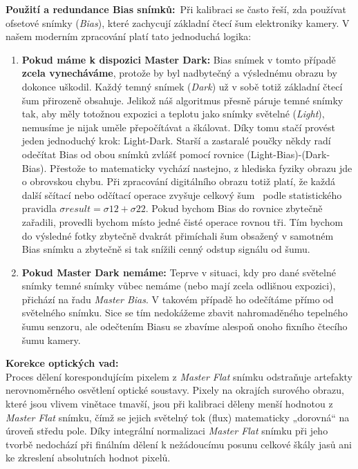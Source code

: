 \textbf{Použití a redundance Bias snímků:}\ Při kalibraci se často řeší, zda používat ofsetové snímky (\textit{Bias}), které zachycují základní čtecí šum elektroniky kamery. V našem moderním zpracování platí tato jednoduchá logika:
\begin{enumerate} 
    \item \textbf{Pokud máme k dispozici Master Dark:} Bias snímek v tomto případě \textbf{zcela vynecháváme}, protože by byl nadbytečný a výslednému obrazu by dokonce uškodil. Každý temný snímek (\textit{Dark}) už v sobě totiž základní čtecí šum přirozeně obsahuje. Jelikož náš algoritmus přesně páruje temné snímky tak, aby měly totožnou expozici a teplotu jako snímky světelné (\textit{Light}), nemusíme je nijak uměle přepočítávat a škálovat.
    Díky tomu stačí provést jeden jednoduchý krok: Light-Dark. Starší a zastaralé poučky někdy radí odečítat Bias od obou snímků zvlášť pomocí rovnice (Light-Bias)-(Dark-Bias). Přestože to matematicky vychází nastejno, z hlediska fyziky obrazu jde o obrovskou chybu. Při zpracování digitálního obrazu totiž platí, že každá další sčítací nebo odčítací operace zvyšuje celkový šum~\cite{howell2006} podle statistického pravidla $\sigma result =\sigma 12 + \sigma 22 $. Pokud bychom Bias do rovnice zbytečně zařadili, provedli bychom místo jedné čisté operace rovnou tři. Tím bychom do výsledné fotky zbytečně dvakrát přimíchali šum obsažený v samotném Bias snímku a zbytečně si tak snížili cenný odstup signálu od šumu.
    \item \textbf{Pokud Master Dark nemáme:} Teprve v situaci, kdy pro dané světelné snímky temné snímky vůbec nemáme (nebo mají zcela odlišnou expozici), přichází na řadu \textit{Master Bias}. V takovém případě ho odečítáme přímo od světelného snímku. Sice se tím nedokážeme zbavit nahromaděného tepelného šumu senzoru, ale odečtením Biasu se zbavíme alespoň onoho fixního čtecího šumu kamery.
\end{enumerate}
\textbf{Korekce optických vad:}\\
Proces dělení korespondujícím pixelem z \textit{Master Flat} snímku odstraňuje artefakty nerovnoměrného osvětlení optické soustavy. Pixely na okrajích surového obrazu, které jsou vlivem vinětace tmavší, jsou při kalibraci děleny menší hodnotou z \textit{Master Flat} snímku, čímž se jejich světelný tok (flux) matematicky „dorovná“ na úroveň středu pole. Díky integrální normalizaci \textit{Master Flat} snímku při jeho tvorbě nedochází při finálním dělení k nežádoucímu posunu celkové škály jasů ani ke zkreslení absolutních hodnot pixelů.